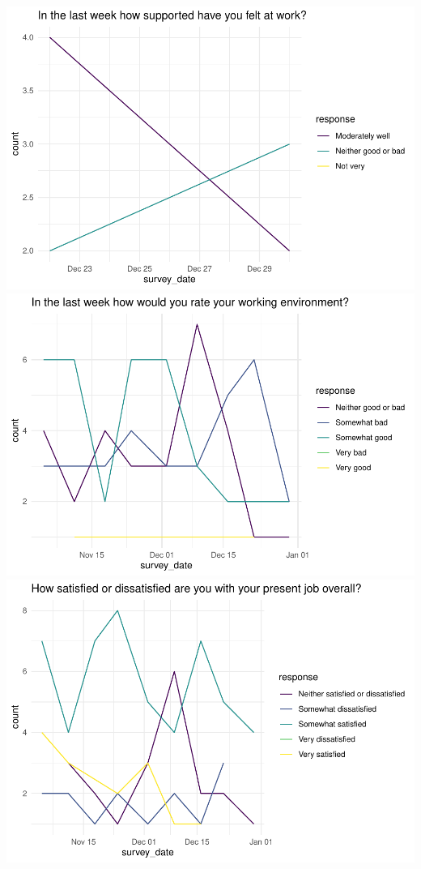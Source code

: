 \documentclass[
  10pt,
]{article}
\begin{document}
\includegraphics{../pdf/Report_files/figure-latex/plot_functions-7.pdf}
\includegraphics{../pdf/Report_files/figure-latex/plot_functions-8.pdf}
\includegraphics{../pdf/Report_files/figure-latex/plot_functions-9.pdf}
\end{document}

